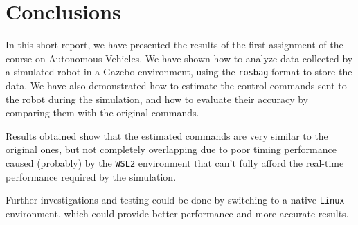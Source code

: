 \section{Conclusions}
\label{sec:conclusions}

In this short report, we have presented the results of the first assignment of the course on Autonomous Vehicles.
We have shown how to analyze data collected by a simulated robot in a Gazebo environment, using the \texttt{rosbag} format to store the data.
We have also demonstrated how to estimate the control commands sent to the robot during the simulation, and how to evaluate their accuracy by comparing them with the original commands.

Results obtained show that the estimated commands are very similar to the original ones, but not completely overlapping due to poor timing performance caused (probably) by the \texttt{WSL2} environment that can't fully afford the real-time performance required by the simulation.

Further investigations and testing could be done by switching to a native \texttt{Linux} environment, which could provide better performance and more accurate results.